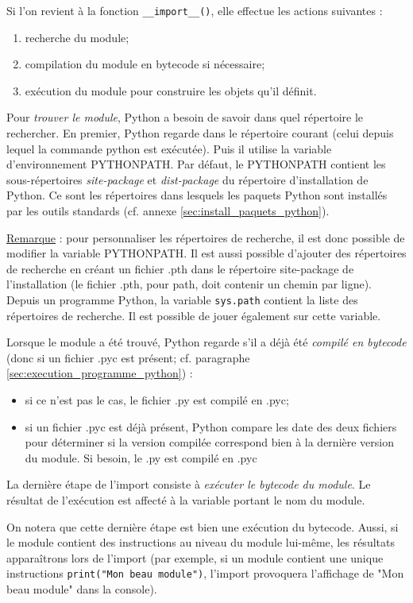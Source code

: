 \documentclass[12pt, a4paper]{article}
\begin{document}
Si l'on revient à la fonction \lstinline{__import__()}, elle effectue les actions suivantes :
\begin{enumerate}
	\item recherche du module;
	\item compilation du module en bytecode si nécessaire;
	\item exécution du module pour construire les objets qu'il définit.
\end{enumerate}

Pour \textit{trouver le module}, Python a besoin de savoir dans quel répertoire le rechercher. En premier, Python regarde dans le répertoire courant (celui depuis lequel la commande python est exécutée). Puis il utilise la variable d'environnement PYTHONPATH. Par défaut, le PYTHONPATH contient les sous-répertoires \textit{site-package} et \textit{dist-package} du répertoire d'installation de Python. Ce sont les répertoires dans lesquels les paquets Python sont installés par les outils standards (cf. annexe \ref{sec:install_paquets_python}). 

\underline{Remarque} : pour personnaliser les répertoires de recherche, il est donc possible de modifier la variable PYTHONPATH. Il est aussi possible d'ajouter des répertoires de recherche en créant un fichier .pth dans le répertoire site-package de l'installation (le fichier .pth, pour path, doit contenir un chemin par ligne). Depuis un programme Python, la variable \lstinline{sys.path} contient la liste des répertoires de recherche. Il est possible de jouer également sur cette variable.


Lorsque le module a été trouvé, Python regarde s'il a déjà été \textit{compilé en bytecode} (donc si un fichier .pyc est présent; cf. paragraphe \ref{sec:execution_programme_python}) :
\begin{itemize}
	\item si ce n'est pas le cas, le fichier .py est compilé en .pyc;
	\item si un fichier .pyc est déjà présent, Python compare les date des deux fichiers pour déterminer si la version compilée correspond bien à la dernière version du module. Si besoin, le .py est compilé en .pyc
\end{itemize}

La dernière étape de l'import consiste à \textsl{exécuter le bytecode du module}. Le résultat de l'exécution est affecté à la variable portant le nom du module.

On notera que cette dernière étape est bien une exécution du bytecode. Aussi, si le module contient des instructions au niveau du module lui-même, les résultats apparaîtrons lors de l'import (par exemple, si un module contient une unique instructions \lstinline{print("Mon beau module")}, l'import provoquera l'affichage de "Mon beau module" dans la console).
\end{document}
